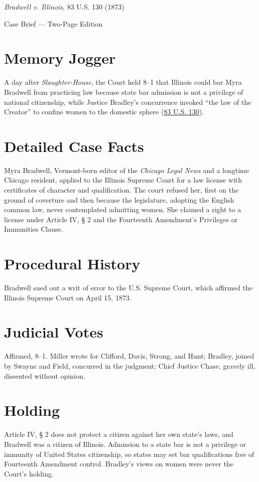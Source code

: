 \documentclass[12pt]{article}
\begin{document}
\begin{center}
{\LARGE \textit{Bradwell v. Illinois}, 83 U.S. 130 (1873)\par}
\vspace{0.5em}
{\large Case Brief --- Two-Page Edition\par}
\end{center}

\section{Memory Jogger}
A day after \textit{Slaughter-House}, the Court held 8--1 that Illinois could bar Myra Bradwell from practicing law because state bar admission is not a privilege of national citizenship, while Justice Bradley's concurrence invoked ``the law of the Creator'' to confine women to the domestic sphere (\href{https://supreme.justia.com/cases/federal/us/83/130/}{83 U.S. 130}).

\section{Detailed Case Facts}
Myra Bradwell, Vermont-born editor of the \textit{Chicago Legal News} and a longtime Chicago resident, applied to the Illinois Supreme Court for a law license with certificates of character and qualification. The court refused her, first on the ground of coverture and then because the legislature, adopting the English common law, never contemplated admitting women. She claimed a right to a license under Article IV, \S{} 2 and the Fourteenth Amendment's Privileges or Immunities Clause.

\section{Procedural History}
Bradwell sued out a writ of error to the U.S. Supreme Court, which affirmed the Illinois Supreme Court on April 15, 1873.

\section{Judicial Votes}
Affirmed, 8--1. Miller wrote for Clifford, Davis, Strong, and Hunt; Bradley, joined by Swayne and Field, concurred in the judgment; Chief Justice Chase, gravely ill, dissented without opinion.

\section{Holding}
Article IV, \S{} 2 does not protect a citizen against her own state's laws, and Bradwell was a citizen of Illinois. Admission to a state bar is not a privilege or immunity of United States citizenship, so states may set bar qualifications free of Fourteenth Amendment control. Bradley's views on women were never the Court's holding.
\end{document}

